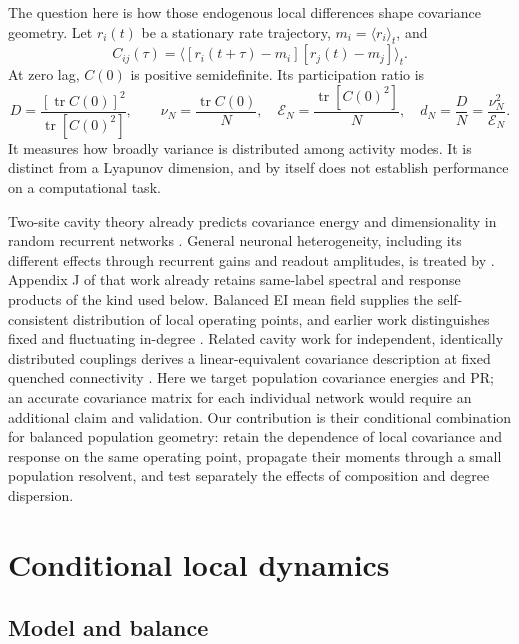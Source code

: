 \documentclass[11pt]{article}
\newcommand{\tr}{\operatorname{tr}}
\newcommand{\PR}{D}
\newcommand{\energy}{\mathcal E}
\begin{document}
The question here is how those endogenous local differences shape covariance
geometry. Let $r_i(t)$ be a stationary rate trajectory, $m_i=\langle
r_i\rangle_t$, and
\begin{equation}
 C_{ij}(\tau)=\langle[r_i(t+\tau)-m_i][r_j(t)-m_j]\rangle_t.
 \label{eq:covariance}
\end{equation}
At zero lag, $C(0)$ is positive semidefinite. Its participation ratio is
\begin{equation}
 \PR=\frac{[\tr C(0)]^2}{\tr[C(0)^2]},\qquad
 \nu_N=\frac{\tr C(0)}{N},\quad
 \energy_N=\frac{\tr[C(0)^2]}{N},\quad
 d_N=\frac{\PR}{N}=\frac{\nu_N^2}{\energy_N}.
 \label{eq:pr}
\end{equation}
It measures how broadly variance is distributed among activity modes.
It is distinct from a Lyapunov dimension, and by itself does not establish
performance on a computational task.

Two-site cavity theory already predicts covariance energy and dimensionality
in random recurrent networks \citep{clark2023}. General neuronal heterogeneity,
including its different effects through recurrent gains and readout amplitudes,
is treated by \citet{clark2025}. Appendix J of that work already retains
same-label spectral and response products of the kind used below.
Balanced EI mean field supplies the
self-consistent distribution of local operating points, and earlier work
distinguishes fixed and fluctuating in-degree \citep{kadmon2015,mastrogiuseppe2017}.
Related cavity work for independent, identically distributed couplings derives
a linear-equivalent covariance description at fixed quenched connectivity
\citep{clark2026linear}. Here we target population
covariance energies and PR; an accurate covariance matrix for each individual
network would require an additional claim and validation.
Our contribution is their conditional combination for balanced population
geometry: retain the dependence of local covariance and response on the same
operating point, propagate their moments through a small population resolvent,
and test separately the effects of composition and degree dispersion.

\section{Conditional local dynamics}

\subsection{Model and balance}
\end{document}
